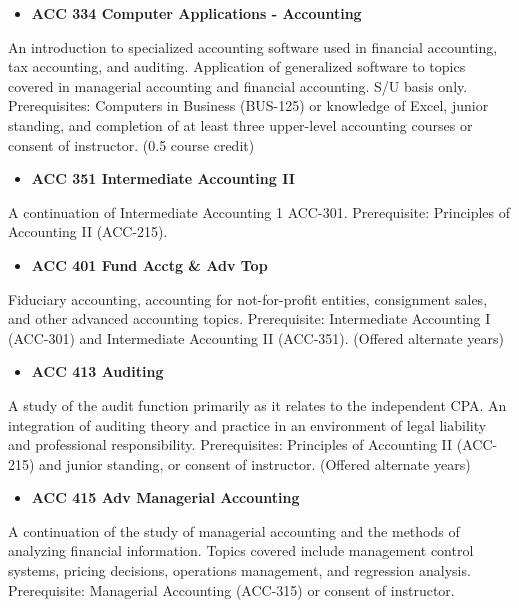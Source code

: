 \documentclass[
  letterpaper,
]{scrbook}
\providecommand{\tightlist}{%
  \setlength{\itemsep}{0pt}\setlength{\parskip}{0pt}}
\begin{document}
\begin{itemize}
\tightlist
\item
  \textbf{ACC 334 Computer Applications - Accounting}
\end{itemize}

An introduction to specialized accounting software used in financial
accounting, tax accounting, and auditing. Application of generalized
software to topics covered in managerial accounting and financial
accounting. S/U basis only. Prerequisites: Computers in Business
(BUS-125) or knowledge of Excel, junior standing, and completion of at
least three upper-level accounting courses or consent of instructor.
(0.5 course credit)

\begin{itemize}
\tightlist
\item
  \textbf{ACC 351 Intermediate Accounting II}
\end{itemize}

A continuation of Intermediate Accounting 1 ACC-301. Prerequisite:
Principles of Accounting II (ACC-215).

\begin{itemize}
\tightlist
\item
  \textbf{ACC 401 Fund Acctg \& Adv Top}
\end{itemize}

Fiduciary accounting, accounting for not-for-profit entities,
consignment sales, and other advanced accounting topics. Prerequisite:
Intermediate Accounting I (ACC-301) and Intermediate Accounting II
(ACC-351). (Offered alternate years)

\begin{itemize}
\tightlist
\item
  \textbf{ACC 413 Auditing}
\end{itemize}

A study of the audit function primarily as it relates to the independent
CPA. An integration of auditing theory and practice in an environment of
legal liability and professional responsibility. Prerequisites:
Principles of Accounting II (ACC-215) and junior standing, or consent of
instructor. (Offered alternate years)

\begin{itemize}
\tightlist
\item
  \textbf{ACC 415 Adv Managerial Accounting}
\end{itemize}

A continuation of the study of managerial accounting and the methods of
analyzing financial information. Topics covered include management
control systems, pricing decisions, operations management, and
regression analysis. Prerequisite: Managerial Accounting (ACC-315) or
consent of instructor.
\end{document}
